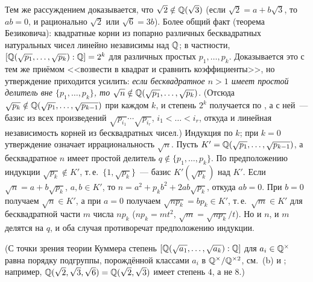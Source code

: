 \begin{example}
Тем же рассуждением доказывается, что $\sqrt2\notin\mathbb Q(\sqrt3)$ (если $\sqrt2=a+b\sqrt3$, то $ab=0$, и рационально $\sqrt2$
или $\sqrt6=3b$). Более общий факт (теорема Безиковича): квадратные корни из попарно различных бесквадратных натуральных чисел линейно
независимы над $\mathbb Q$; в частности, $[\mathbb Q(\sqrt{p_1},\dots,\sqrt{p_k}):\mathbb Q]=2^k$ для различных простых $p_1,\dots,p_k$.
Доказывается это с тем же приёмом <<возвести в квадрат и сравнить коэффициенты>>, но утверждение приходится усилить:
\emph{если бесквадратное $n>1$ имеет простой делитель вне $\{p_1,\dots,p_k\}$, то
$\sqrt n\notin\mathbb Q(\sqrt{p_1},\dots,\sqrt{p_k})$}. (Отсюда $\sqrt{p_k}\notin\mathbb Q(\sqrt{p_1},\dots,\sqrt{p_{k-1}})$ при каждом
$k$, и степень $2^k$ получается по , а с ней~--- базис из всех произведений
$\sqrt{p_{i_1}}\cdots\sqrt{p_{i_r}}$, $i_1<\dots<i_r$, откуда и линейная независимость корней из бесквадратных чисел.) Индукция по $k$; при $k=0$ утверждение означает иррациональность $\sqrt n$.
Пусть $K'=\mathbb Q(\sqrt{p_1},\dots,\sqrt{p_{k-1}})$, а бесквадратное $n$ имеет простой делитель $q\notin\{p_1,\dots,p_k\}$. По
предположению индукции $\sqrt{p_k}\notin K'$, т.\,е.\ $\{1,\sqrt{p_k}\}$~--- базис $K'(\sqrt{p_k})$ над $K'$. Если
$\sqrt n=a+b\sqrt{p_k}$, $a,b\in K'$, то $n=a^2+p_kb^2+2ab\sqrt{p_k}$, откуда $ab=0$. При $b=0$ получаем $\sqrt n\in K'$, а
при $a=0$ получаем $\sqrt{np_k}=bp_k\in K'$, т.\,е.\ $\sqrt m\in K'$ для бесквадратной части $m$ числа $np_k$
($np_k=mt^2$, $\sqrt m=\sqrt{np_k}/t$). Но и $n$, и $m$ делятся на $q$, и оба случая противоречат предположению индукции.

(С точки зрения теории Куммера степень $[\mathbb Q(\sqrt{a_1},\dots,\sqrt{a_k}):\mathbb Q]$ для $a_i\in\mathbb Q^\times$ равна порядку подгруппы,
порождённой классами $a_i$ в $\mathbb Q^\times/\mathbb Q^{\times2}$, см.\ (b) и ; например, $\mathbb Q(\sqrt2,\sqrt3,\sqrt6)=\mathbb Q(\sqrt2,\sqrt3)$
имеет степень $4$, а не $8$.)
\end{example}

